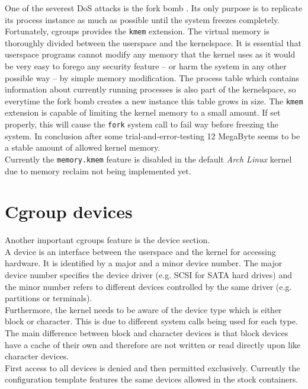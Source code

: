 One of the severest DoS attacks is the fork bomb \cite{forkbomb}. Its only purpose is to replicate its process instance as much as possible until
the system freezes completely. Fortunately, cgroups provides
the \texttt{kmem} extension. The virtual memory is thoroughly divided between the userspace and the kernelspace\cite{kernelspace}.
It is essential that userspace programs
cannot modify any memory that the kernel uses as it would be very easy to forego any security feature -- or harm the system in any other possible way --
by simple memory modification. The process table which contains information about currently running processes is also part of the kernelspace,
so everytime the fork bomb creates a new instance this table grows in size.
The \texttt{kmem} extension is capable of limiting the kernel memory to a small amount. If set properly, this will cause the \texttt{fork}
system call to fail way before freezing the system. In conclusion after some trial-and-error-testing 12 MegaByte seems to be a
stable amount of allowed kernel memory.\\
Currently the \texttt{memory.kmem} feature is disabled in the default \textit{Arch Linux} kernel due to memory reclaim not being implemented yet\cite{kmembug}.\\

\section{Cgroup devices}

Another important cgroups feature is the device section.\\
A device is an interface between the userspace and the kernel for accessing hardware. It is identified by a major and a minor
device number.
The major device number specifies the device driver (e.g. SCSI for SATA hard drives) and the minor number refers to different
devices controlled by the same driver (e.g. partitions or terminals)\cite{devicenumbers}.\\
Furthermore, the kernel needs to be aware of the device type which is either block or character. This is due to different system
calls being used for each type.
The main difference between block and character devices is that block devices have a cache of their own and therefore are not
written or read directly upon like character devices.\\
First access to all devices is denied and then permitted exclusively.
Currently the configuration template features the same devices allowed in the stock containers.

